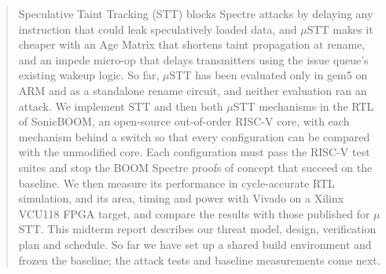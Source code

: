 \begin{abstract}

Speculative Taint Tracking (STT) blocks Spectre attacks by delaying any
instruction that could leak speculatively loaded data, and $\mu$STT makes
it cheaper with an Age Matrix that shortens taint
propagation at rename, and an impede micro-op that delays transmitters
using the issue queue's existing wakeup logic. So far, $\mu$STT has been
evaluated only in gem5 on ARM and as a standalone rename circuit, and
neither evaluation ran an attack. We implement STT and then both
$\mu$STT mechanisms in the RTL of SonicBOOM, an open-source out-of-order
RISC-V core, with each mechanism behind a switch so that every
configuration can be compared with the unmodified core. Each configuration
must pass the RISC-V test suites and stop the BOOM Spectre proofs of
concept that succeed on the baseline. We then measure its performance in
cycle-accurate RTL simulation, and its area, timing and power with Vivado
on a Xilinx VCU118 FPGA target, and compare the results with those
published for $\mu$STT. This midterm report describes our threat model,
design, verification plan and schedule. So far we have set up a shared
build environment and frozen the baseline; the attack tests and baseline
measurements come next.
\end{abstract}
